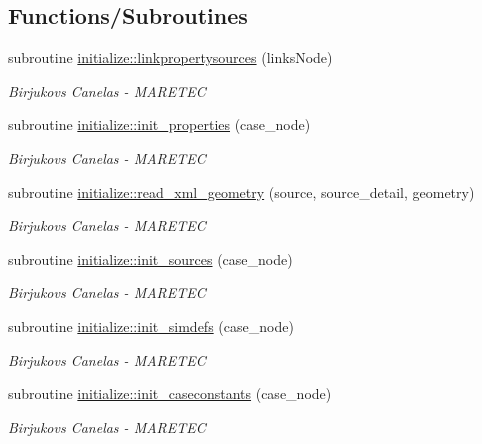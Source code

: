 \subsection*{Functions/\+Subroutines}
\begin{DoxyCompactItemize}
\item 
subroutine \hyperlink{namespaceinitialize_ab91b27efd537a161ee9ca4b2d9efde1a}{initialize\+::linkpropertysources} (links\+Node)
\begin{DoxyCompactList}\small\item\em Birjukovs Canelas -\/ M\+A\+R\+E\+T\+EC \end{DoxyCompactList}\item 
subroutine \hyperlink{namespaceinitialize_a4640ad15e29b88467ec842f274f64b62}{initialize\+::init\+\_\+properties} (case\+\_\+node)
\begin{DoxyCompactList}\small\item\em Birjukovs Canelas -\/ M\+A\+R\+E\+T\+EC \end{DoxyCompactList}\item 
subroutine \hyperlink{namespaceinitialize_ad36e4f602dab66c06a1f0e2474e9f0a6}{initialize\+::read\+\_\+xml\+\_\+geometry} (source, source\+\_\+detail, geometry)
\begin{DoxyCompactList}\small\item\em Birjukovs Canelas -\/ M\+A\+R\+E\+T\+EC \end{DoxyCompactList}\item 
subroutine \hyperlink{namespaceinitialize_a9ed75476e5dd07928aed3442281930be}{initialize\+::init\+\_\+sources} (case\+\_\+node)
\begin{DoxyCompactList}\small\item\em Birjukovs Canelas -\/ M\+A\+R\+E\+T\+EC \end{DoxyCompactList}\item 
subroutine \hyperlink{namespaceinitialize_adb972e92da4789506ee6b62b702df2b3}{initialize\+::init\+\_\+simdefs} (case\+\_\+node)
\begin{DoxyCompactList}\small\item\em Birjukovs Canelas -\/ M\+A\+R\+E\+T\+EC \end{DoxyCompactList}\item 
subroutine \hyperlink{namespaceinitialize_a4c982b312ab10bf112dd3d2bc314569e}{initialize\+::init\+\_\+caseconstants} (case\+\_\+node)
\begin{DoxyCompactList}\small\item\em Birjukovs Canelas -\/ M\+A\+R\+E\+T\+EC \end{DoxyCompactList}\item 

\end{DoxyCompactItemize}

